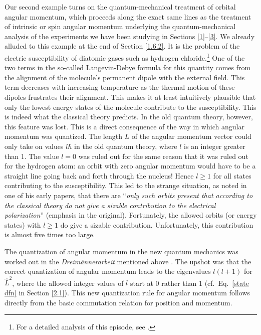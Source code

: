 Our second example turns on the quantum-mechanical treatment of orbital angular momentum, which proceeds along the exact same lines as the treatment of intrinsic or spin angular momentum underlying the quantum-mechanical analysis of the experiments we have been studying in Sections \ref{1}--\ref{3}. We already alluded to this example at the end of Section \ref{1.6.2}. It is the problem of the electric susceptibility of diatomic gases such as hydrogen chloride.\footnote{For a detailed analysis of this episode, see \citet{Midwinter and Janssen 2013}.} One of the two terms in the so-called Langevin-Debye formula for this quantity comes from the alignment of the molecule's permanent dipole with the external field. This term decreases with increasing temperature as the thermal motion of these dipoles frustrates their alignment. This makes it at least intuitively plausible that only the lowest energy states of the molecule contribute to the susceptibility. This is indeed what the classical theory predicts. In the old quantum theory, however, this feature was lost. This is a direct consequence of the way in which angular momentum was quantized. The length $L$ of the angular momentum vector could only take on values $l \hbar$  in the old quantum theory, where $l$ is an integer greater than 1. The value $l=0$ was ruled out for the same reason that it was ruled out for the hydrogen atom: an orbit with zero angular momentum would have to be a straight line going back and forth through the nucleus! Hence $l \ge 1$ for all states contributing to the susceptibility. This led to the strange situation, as \citet[p.\ 325]{Pauli 1921} noted in one of his early papers, that there are ``{\it only such orbits present that according to the classical theory do not give a sizable contribution to the electrical polarization}'' (emphasis in the original). Fortunately, the allowed orbits (or energy states) with $l \ge 1$ do give a sizable contribution. Unfortunately, this contribution is almost five times too large.

The quantization of angular momentum in the new quantum mechanics was worked out in the \emph{Dreim\"annerarbeit} mentioned above \citep[pp.\ 364--374]{dreimaenner}. The upshot was that the correct quantization of angular momentum leads to the eigenvalues $l(l+1)$ for $\hat{L}^2$, where the allowed integer values of $l$ start at 0 rather than 1 (cf.\ Eq.\ \eqref{state dfn} in Section \ref{2.1}). This new quantization rule for angular momentum follows directly from the basic commutation relation for position and momentum.

